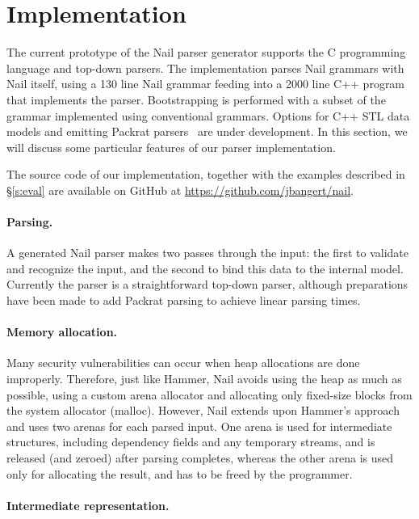 \section{Implementation}
\label{s:impl}

The current prototype of the Nail parser generator supports the C programming
language and top-down parsers. The implementation parses Nail grammars with Nail itself, using a 130
line Nail grammar feeding into a 2000 line C++ program that implements the parser. Bootstrapping is
performed with a subset of the grammar implemented using conventional grammars. 
Options for C++ STL data models and emitting
Packrat parsers~\cite{packrat-parsing:icfp02} are under development. In
this section, we will discuss some particular features of our parser
implementation.

The source code of our implementation, together with the examples described in
\S\ref{s:eval} are available on GitHub at \url{https://github.com/jbangert/nail}.


\paragraph{Parsing.}

A generated Nail parser makes two passes through the input: the first to
validate and recognize the input, and the second to bind this data to the internal
model. Currently the parser is a straightforward top-down parser, although
preparations have been made to add Packrat parsing to achieve linear parsing
times.

\paragraph{Memory allocation.}

Many security vulnerabilities can occur when heap allocations are done improperly. Therefore, just
like Hammer, Nail avoids using the heap as much as possible, using a custom arena allocator and
allocating only fixed-size blocks from the system allocator (malloc). However, Nail extends upon
Hammer's approach and uses two arenas for each parsed input. One arena is used for intermediate
structures, including dependency fields and any temporary streams, and is released (and zeroed)
after parsing completes, whereas the other arena is used only for allocating the result, and has to
be freed by the programmer.

\paragraph{Intermediate representation.}

